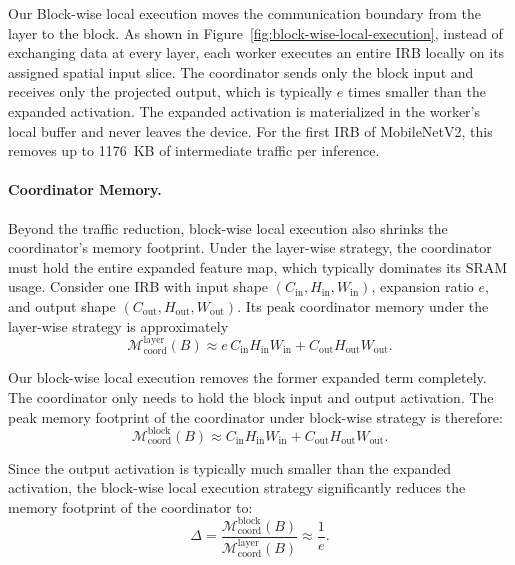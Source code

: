 Our Block-wise local execution moves the communication boundary from the layer to the block.
As shown in Figure~\ref{fig:block-wise-local-execution}, instead of exchanging data at every layer, each worker executes an entire IRB locally on its assigned spatial input slice.
The coordinator sends only the block input and receives only the projected output, which is typically $e$ times smaller than the expanded activation.
The expanded activation is materialized in the worker's local buffer and never leaves the device.
For the first IRB of MobileNetV2, this removes up to 1176~KB of intermediate traffic per inference.


\paragraph{Coordinator Memory.}
Beyond the traffic reduction, block-wise local execution also shrinks the coordinator's memory footprint.
Under the layer-wise strategy, the coordinator must hold the entire expanded feature map, which typically dominates its SRAM usage.
Consider one IRB with input shape $(C_{\mathrm{in}}, H_{\mathrm{in}}, W_{\mathrm{in}})$, expansion ratio $e$, and output shape $(C_{\mathrm{out}}, H_{\mathrm{out}}, W_{\mathrm{out}})$.
Its peak coordinator memory under the layer-wise strategy is approximately
\begin{equation}
\mathcal{M}^{\mathrm{layer}}_{\mathrm{coord}}(B) \approx e\, C_{\mathrm{in}} H_{\mathrm{in}} W_{\mathrm{in}} + C_{\mathrm{out}} H_{\mathrm{out}} W_{\mathrm{out}}.
\label{eq:sd-mem-layer}
\end{equation}

Our block-wise local execution removes the former expanded term completely. The coordinator only needs to hold the block input and output activation. The peak memory footprint of the coordinator under block-wise strategy is therefore:
\begin{equation}
\mathcal{M}^{\mathrm{block}}_{\mathrm{coord}}(B) \approx C_{\mathrm{in}} H_{\mathrm{in}} W_{\mathrm{in}} + C_{\mathrm{out}} H_{\mathrm{out}} W_{\mathrm{out}}.
\end{equation}

Since the output activation is typically much smaller than the expanded activation, the block-wise local execution strategy significantly reduces the memory footprint of the coordinator to:
\begin{equation}
\Delta = \frac{\mathcal{M}^{\mathrm{block}}_{\mathrm{coord}}(B)}{\mathcal{M}^{\mathrm{layer}}_{\mathrm{coord}}(B)} \approx \frac{1}{e}.
\end{equation}  

